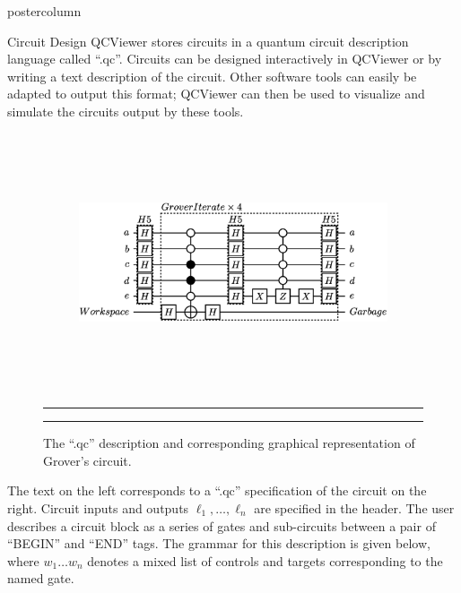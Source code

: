 \documentclass[final]{beamer} %
\begin{document}
\begin{frame}{}
\begin{columns}
\begin{column}{.33\textwidth}
\begin{beamercolorbox}[center,wd=\textwidth]{postercolumn}
\begin{minipage}[c][0.95\textheight][s]{0.95\columnwidth}
\begin{block}{\large Circuit Design}
                QCViewer stores circuits in a quantum circuit description
                language called ``.qc''.  Circuits can be designed
                interactively in QCViewer or by writing a text
                description of the circuit. Other software tools can easily be
                adapted to output this format; QCViewer can then be used to
                visualize and simulate the circuits output by these tools.
                \begin{figure}[!htbp]
                \centering
                \begin{minipage}{0.9\textwidth}
                  \hspace{1em}
                  \begin{figure}
                    \vspace*{1.5em}
                    \begin{center}
                      \includegraphics[height=3in]{figures/Grover_Circuit.eps}
                    \end{center}
                  \end{figure}
                  \hrule
                  \hrule
                  \vspace*{1em}
                \end{minipage}
                \caption{The ``.qc'' description and corresponding graphical representation of Grover's circuit.}
                \end{figure}

                The text on the left corresponds to a ``.qc'' specification of the circuit on the right.
                Circuit inputs and outputs $\ell_1, \ldots, \ell_n$ are specified in the header.
                The user describes a circuit block as a series of gates and sub-circuits between a pair of ``BEGIN'' and ``END'' tags.
                The grammar for this description is given below, where $w_1 \ldots w_n$ denotes a mixed list of controls and targets
                corresponding to the named gate.


\end{block}
\end{minipage}
\end{beamercolorbox}
\end{column}
\end{columns}
\end{frame}
\end{document}
